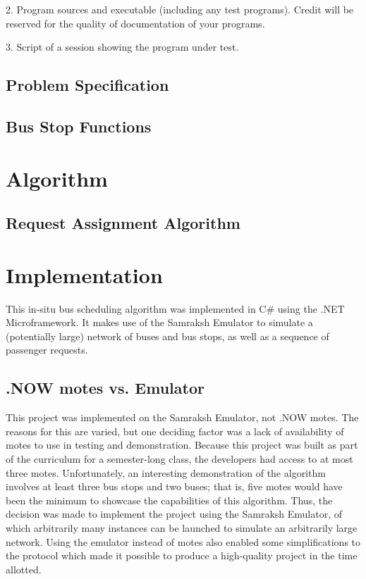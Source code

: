 \documentclass[runningheads]{llncs}
\begin{document}
2. Program sources and executable (including any test programs). Credit will be reserved for the quality of documentation of your programs.

3. Script of a session showing the program under test.

\subsection{Problem Specification}
\subsection{Bus Stop Functions}

\section{Algorithm}
\subsection{Request Assignment Algorithm}

\section{Implementation}
This in-situ bus scheduling algorithm was implemented in C\# using the .NET Microframework. It makes use of the Samraksh Emulator to simulate a (potentially large) network of buses and bus stops, as well as a sequence of passenger requests.

\subsection{.NOW motes vs. Emulator}
This project was implemented on the Samraksh Emulator, not .NOW motes. The reasons for this are varied, but one deciding factor was a lack of availability of motes to use in testing and demonstration. Because this project was built as part of the curriculum for a semester-long class, the developers had access to at most three motes. Unfortunately, an interesting demonstration of the algorithm involves at least three bus stops and two buses; that is, five motes would have been the minimum to showcase the capabilities of this algorithm. Thus, the decision was made to implement the project using the Samraksh Emulator, of which arbitrarily many instances can be launched to simulate an arbitrarily large network. Using the emulator instead of motes also enabled some simplifications to the protocol which made it possible to produce a high-quality project in the time allotted.
\end{document}
